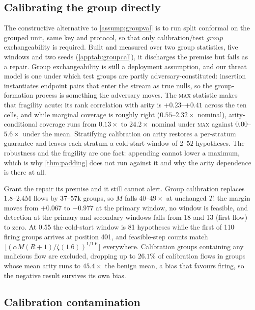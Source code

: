 \documentclass[conference]{IEEEtran}
\newcommand{\ceil}{M}
\begin{document}
\subsection{Calibrating the group directly}\label{sec:groupcal}

The constructive alternative to \cref{assump:groupval} is to run split conformal on the grouped unit,
same key and protocol, so that only calibration/test \emph{group} exchangeability is required. Built and
measured over two group statistics, five windows and two seeds (\cref{apptab:groupcal}), it discharges
the premise but fails as a repair. Group exchangeability is still a deployment assumption, and our threat
model is one under which test groups are partly adversary-constituted: insertion instantiates endpoint
pairs that enter the stream as true nulls, so the group-formation process is something the adversary
moves. The \textsc{max} statistic makes that fragility acute: its rank correlation with arity is
$+0.23$--$+0.41$ across the ten cells, and while marginal coverage is roughly right ($0.55$--$2.32\times$
nominal), arity-conditional coverage runs from $0.13\times$ to $24.2\times$ nominal under \textsc{max}
against $0.00$--$5.6\times$ under the mean. Stratifying calibration on arity restores a per-stratum
guarantee and leaves each stratum a cold-start window of $2$--$52$ hypotheses. The robustness and the
fragility are one fact: appending cannot lower a maximum, which is why \cref{thm:padding} does not run
against it and why the arity dependence is there at all.

Grant the repair its premise and it still cannot alert. Group calibration replaces $1.8$--$2.4$M flows by
$37$--$57$k groups, so $\ceil$ falls $40$--$49\times$ at unchanged $T$: the margin moves from $+0.067$ to
$-0.977$ at the primary window, no window is feasible, and detection at the primary and secondary
windows falls from 18 and 13 (first-flow) to zero. At 0.55 the cold-start window is 81 hypotheses while
the first of 110 firing groups arrives at position 401, and feasible-step counts match
$\lfloor(\alpha\ceil(R{+}1)/\zeta(1.6))^{1/1.6}\rfloor$ everywhere. Calibration groups containing any
malicious flow are excluded, dropping up to $26.1\%$ of calibration flows in groups whose mean arity runs
to $45.4\times$ the benign mean, a bias that favours firing, so the negative result survives its own bias.

\subsection{Calibration contamination}\label{sec:contamination}
\end{document}
